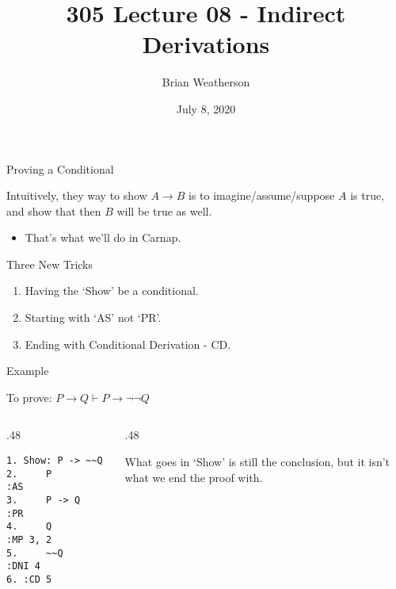 \documentclass[
  ignorenonframetext,
]{beamer}
\title{305 Lecture 08 - Indirect Derivations}
\author{Brian Weatherson}
\date{July 8, 2020}
\providecommand{\tightlist}{%
  \setlength{\itemsep}{0pt}\setlength{\parskip}{0pt}}
\renewcommand{\,}{\text{, }}
\def\begincols{\begin{columns}}
\def\begincol{\begin{column}}
\def\endcol{\end{column}}
\def\endcols{\end{columns}}
\begin{document}
\frame{\titlepage}

\begin{frame}{Proving a Conditional}
\protect\hypertarget{proving-a-conditional}{}

Intuitively, they way to show \(A \rightarrow B\) is to
imagine/assume/suppose \(A\) is true, and show that then \(B\) will be
true as well.

\begin{itemize}
\tightlist
\item
  That's what we'll do in Carnap.
\end{itemize}

\end{frame}

\begin{frame}{Three New Tricks}
\protect\hypertarget{three-new-tricks}{}

\begin{enumerate}
\tightlist
\item
  Having the `Show' be a conditional.
\item
  Starting with `AS' not `PR'.
\item
  Ending with Conditional Derivation - CD.
\end{enumerate}

\end{frame}

\begin{frame}[fragile]{Example}
\protect\hypertarget{example}{}

To prove: \(P \rightarrow Q \vdash P \rightarrow \neg \neg Q\)

\bigskip

\begincols
\begincol{.48\textwidth}

\begin{verbatim}
1. Show: P -> ~~Q
2.     P          :AS
3.     P -> Q     :PR
4.     Q          :MP 3, 2
5.     ~~Q        :DNI 4
6. :CD 5
\end{verbatim}

\endcol
\begincol{.48\textwidth}

What goes in `Show' is still the conclusion, but it isn't what we end
the proof with.

\endcol
\endcols

\end{frame}
\end{document}
